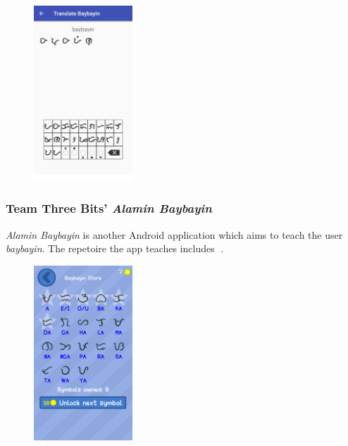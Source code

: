 \documentclass[a4paper,pagesize,openany,14pt,parskip=never]{scrbook}
\newcommand{\≈}{$\approx$}
\newcommand{\ra}{{\baybayin ᜍ}}
\begin{document}
\begin{figure}[H]
\includegraphics[width=0.33\textwidth]{LearnBaybayin}
\end{figure}

\subsubsection{Team Three Bits' {\em Alamin Baybayin}}

{\em Alamin Baybayin} is another Android application which aims to teach the user {\em baybayin}. The repetoire the app teaches includes \ra.

\begin{figure}[H]
\includegraphics[width=0.33\textwidth]{Alamin}
\end{figure}
\end{document}
